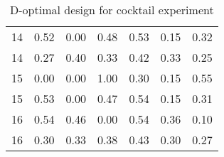 \begin{table}[ht]
\begin{tabular}{lrrrrrr}
  14 & 0.52 & 0.00 & 0.48 & 0.53 & 0.15 & 0.32 \\ 
  14 & 0.27 & 0.40 & 0.33 & 0.42 & 0.33 & 0.25 \\ 
  15 & 0.00 & 0.00 & 1.00 & 0.30 & 0.15 & 0.55 \\ 
  15 & 0.53 & 0.00 & 0.47 & 0.54 & 0.15 & 0.31 \\ 
  16 & 0.54 & 0.46 & 0.00 & 0.54 & 0.36 & 0.10 \\ 
  16 & 0.30 & 0.33 & 0.38 & 0.43 & 0.30 & 0.27 \\ 
   \hline
\end{tabular}
\caption{D-optimal design for cocktail experiment} 
\label{tab:cocktail_exp_d_optimal_des}
\end{table}
